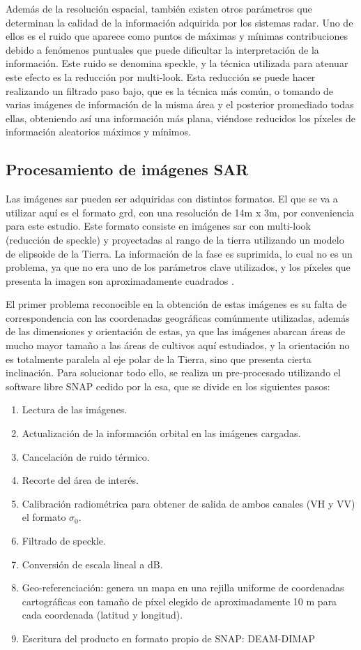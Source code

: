 \par Además de la resolución espacial, también existen otros parámetros que determinan la calidad de la información adquirida por los sistemas radar. Uno de ellos es el ruido que aparece como puntos de máximas y mínimas contribuciones debido a fenómenos puntuales que puede dificultar la interpretación de la información. Este ruido se denomina speckle, y la técnica utilizada para atenuar este efecto es la reducción por multi-look. Esta reducción se puede hacer realizando un filtrado paso bajo, que es la técnica más común, o tomando de varias imágenes de información de la misma área y el posterior promediado todas ellas, obteniendo así una información más plana, viéndose reducidos los píxeles de información aleatorios máximos y mínimos. 

\subsection{Procesamiento de imágenes SAR}
\par Las imágenes \gls{sar} pueden ser adquiridas con distintos formatos. El que se va a utilizar aquí es el formato \gls{grd}, con una resolución de 14m x 3m, por conveniencia para este estudio. Este formato consiste en imágenes \gls{sar} con multi-look (reducción de speckle) y proyectadas al rango de la tierra utilizando un modelo de elipsoide de la Tierra. La información de la fase es suprimida, lo cual no es un problema, ya que no era uno de los parámetros clave utilizados, y los píxeles que presenta la imagen son aproximadamente cuadrados \cite{copData}. 
\\
\par El primer problema reconocible en la obtención de estas imágenes es su falta de correspondencia con las coordenadas geográficas comúnmente utilizadas, además de las dimensiones y orientación de estas, ya que las imágenes abarcan áreas de mucho mayor tamaño a las áreas de cultivos aquí estudiados, y la orientación no es totalmente paralela al eje polar de la Tierra, sino que presenta cierta inclinación. Para solucionar todo ello, se realiza un pre-procesado utilizando el software libre SNAP cedido por la \gls{esa}, que se divide en los siguientes pasos:
\begin{enumerate}
	\item Lectura de las imágenes.
	\item Actualización de la información orbital en las imágenes cargadas.
	\item Cancelación de ruido térmico.
	\item Recorte del área de interés.
	\item Calibración radiométrica para obtener de salida de ambos canales (VH y VV) el formato $\sigma_{0}$.
	\item Filtrado de speckle.
	\item Conversión de escala lineal a dB.
	\item Geo-referenciación: genera un mapa en una rejilla uniforme de
coordenadas cartográficas con tamaño de píxel elegido de aproximadamente 10 m para cada coordenada (latitud y longitud).
	\item Escritura del producto en formato propio de SNAP: DEAM-DIMAP 
\end{enumerate}

